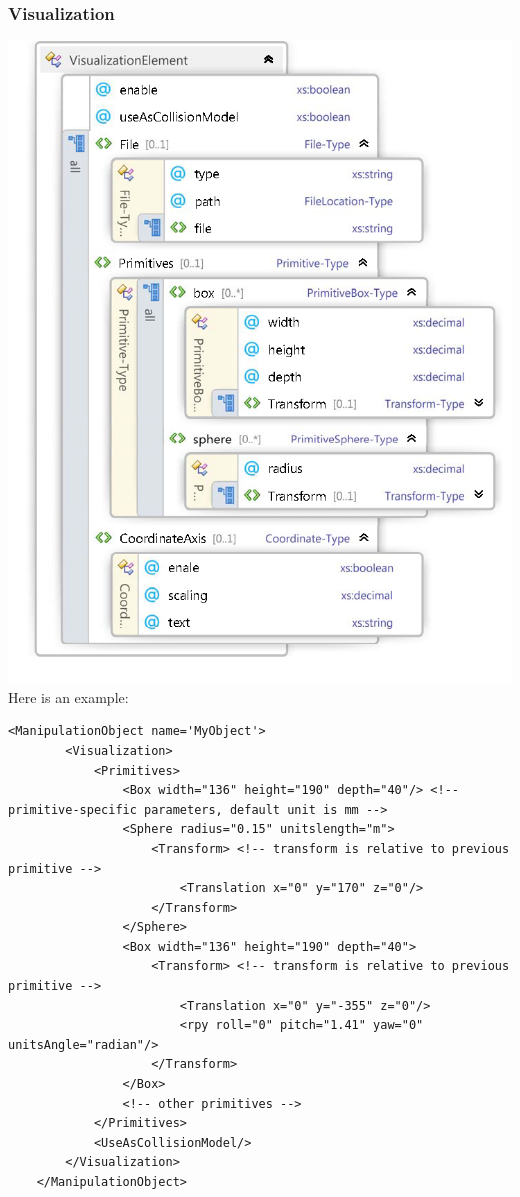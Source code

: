 \subsubsection{Visualization}
\includegraphics[width=\textwidth]{Visualization} 
Here is an example:
\begin{lstlisting}
<ManipulationObject name='MyObject'>
        <Visualization>
            <Primitives>
                <Box width="136" height="190" depth="40"/> <!-- primitive-specific parameters, default unit is mm -->
                <Sphere radius="0.15" unitslength="m">
                    <Transform> <!-- transform is relative to previous primitive -->
                        <Translation x="0" y="170" z="0"/>
                    </Transform>
                </Sphere>
                <Box width="136" height="190" depth="40">
                    <Transform> <!-- transform is relative to previous primitive -->
                        <Translation x="0" y="-355" z="0"/>
                        <rpy roll="0" pitch="1.41" yaw="0" unitsAngle="radian"/>
                    </Transform>
                </Box>
                <!-- other primitives -->
            </Primitives>
            <UseAsCollisionModel/>
        </Visualization>
    </ManipulationObject>
\end{lstlisting}
